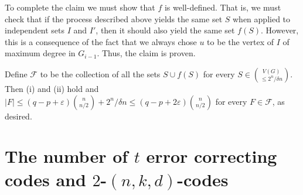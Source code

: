 \documentclass[11pt]{article}
\numberwithin{equation}{section}
\def\eps{\varepsilon}
\begin{document}
To complete the claim we must show that $f$ is well-defined. That is, we must check that if the process described above yields the same set $S$ when applied to independent sets $I$ and $I'$, then it should also yield the same set $f(S)$. However, this is a consequence of the fact that we always chose $u$ to be the vertex of $I$ of maximum degree in $G_{i-1}$.  Thus, the claim is proven.

\medskip

Define $\mathcal F$ to be the collection of all the sets $S \cup f(S)$ for every $S \in \binom{V(G)}{\leq 2^n/\delta n} $. Then  (i) and (ii) hold and $|F|\leq (q-p+\eps)\binom{n}{n/2}+2^n/\delta n
\leq (q-p+2\eps)\binom{n}{n/2}$ for every $F \in \mathcal F$, as desired.

\endproof



























\section{The number of $t$ error correcting codes and $2$-$(n,k,d)$-codes}\label{sec:code}
\end{document}
